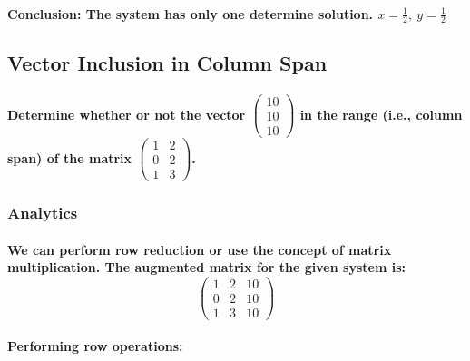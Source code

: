 \paragraph{\textbf{Conclusion:} The system has only one determine solution. $x=\frac{1}{2},\ y=\frac{1}{2}$}
% 
% 
% 
% 
% 
% 
% 
\subsection{Vector Inclusion in Column Span}
\paragraph{Determine whether or not the vector
    $
        \begin{pmatrix}
            10 \\
            10 \\
            10
        \end{pmatrix}
    $
    in the range (i.e., column span) of the matrix
    $
        \begin{pmatrix}
            1 & 2 \\
            0 & 2 \\
            1 & 3
        \end{pmatrix}
    $.}

% 
% 
% 
% 
% 
\subsubsection{Analytics}
\paragraph{We can perform row reduction or use the concept of matrix multiplication. The augmented matrix for the given system is:
    \[ \left(\begin{array}{cc|c}
            1 & 2 & 10 \\
            0 & 2 & 10 \\
            1 & 3 & 10
        \end{array}\right) \]
}
% 
% 
% 
% 
% 
\paragraph{Performing row operations:}
% 
